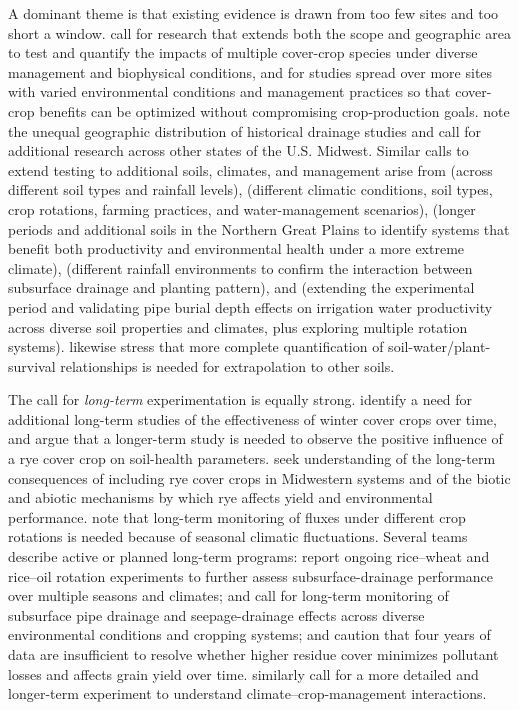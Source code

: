 A dominant theme is that existing evidence is drawn from too few sites and too short a window. \textcite{Birru2023} call for research that extends both the scope and geographic area to test and quantify the impacts of multiple cover-crop species under diverse management and biophysical conditions, and for studies spread over more sites with varied environmental conditions and management practices so that cover-crop benefits can be optimized without compromising crop-production goals. \textcite{Zhao2016} note the unequal geographic distribution of historical drainage studies and call for additional research across other states of the U.S. Midwest. Similar calls to extend testing to additional soils, climates, and management arise from \textcite{Grewal2025} (across different soil types and rainfall levels), \textcite{Negm2014} (different climatic conditions, soil types, crop rotations, farming practices, and water-management scenarios), \textcite{Saha2024} (longer periods and additional soils in the Northern Great Plains to identify systems that benefit both productivity and environmental health under a more extreme climate), \textcite{Takeshima2023} (different rainfall environments to confirm the interaction between subsurface drainage and planting pattern), and \textcite{Liu2025} (extending the experimental period and validating pipe burial depth effects on irrigation water productivity across diverse soil properties and climates, plus exploring multiple rotation systems). \textcite{BENOIT1967} likewise stress that more complete quantification of soil-water/plant-survival relationships is needed for extrapolation to other soils.

The call for \emph{long-term} experimentation is equally strong. \textcite{Kaspar2012} identify a need for additional long-term studies of the effectiveness of winter cover crops over time, and \textcite{Bawa2023} argue that a longer-term study is needed to observe the positive influence of a rye cover crop on soil-health parameters. \textcite{MartinezFeria2016} seek understanding of the long-term consequences of including rye cover crops in Midwestern systems and of the biotic and abiotic mechanisms by which rye affects yield and environmental performance. \textcite{Kumar2014b} note that long-term monitoring of fluxes under different crop rotations is needed because of seasonal climatic fluctuations. Several teams describe active or planned long-term programs: \textcite{Qi2025b} report ongoing rice--wheat and rice--oil rotation experiments to further assess subsurface-drainage performance over multiple seasons and climates; \textcite{Liu2025b} and \textcite{Liu2025c} call for long-term monitoring of subsurface pipe drainage and seepage-drainage effects across diverse environmental conditions and cropping systems; and \textcite{Thoma2005} caution that four years of data are insufficient to resolve whether higher residue cover minimizes pollutant losses and affects grain yield over time. \textcite{Acharya2019b} similarly call for a more detailed and longer-term experiment to understand climate--crop-management interactions.

